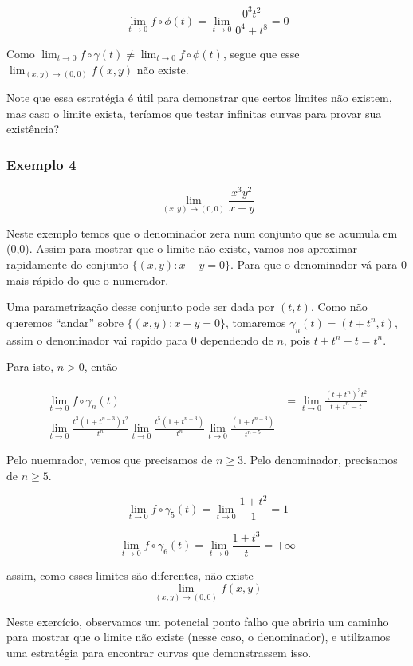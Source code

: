 \documentclass[
  letterpaper,
  DIV=11,
  numbers=noendperiod]{scrreprt}
\begin{document}
\[
\lim_{t\rightarrow 0} f \circ \phi (t) = \lim_{t\rightarrow 0} \frac{0^3 t^2}{0^4+t^8} = 0
\]

Como
\(\lim_{t\rightarrow 0} f \circ \gamma (t) \neq \lim_{t\rightarrow 0} f \circ \phi(t)\),
segue que esse \(\lim_{(x,y)\rightarrow (0,0)} f(x,y)\) não existe.

Note que essa estratégia é útil para demonstrar que certos limites não
existem, mas caso o limite exista, teríamos que testar infinitas curvas
para provar sua existência?

\subsubsection{Exemplo 4}\label{exemplo-4}

\[
\lim_{(x,y) \rightarrow (0,0)} \frac{x^3 y^2}{x-y}
\]

Neste exemplo temos que o denominador zera num conjunto que se acumula
em (0,0). Assim para mostrar que o limite não existe, vamos nos
aproximar rapidamente do conjunto \(\{(x,y):x-y =0\}\). Para que o
denominador vá para \(0\) mais rápido do que o numerador.

Uma parametrização desse conjunto pode ser dada por \((t,t)\). Como não
queremos ``andar'' sobre \(\{(x,y):x-y =0\}\), tomaremos
\(\gamma_n (t) = (t+t^n,t)\), assim o denominador vai rapido para 0
dependendo de \(n\), pois \(t+t^n-t = t^n\).

Para isto, \(n>0\), então

\[
\begin{aligned}
\lim_{t\rightarrow 0} f \circ \gamma_{n}(t) &= \lim_{t\rightarrow 0}
\frac{(t+t^n)^3t^2}{t+t^n-t} \\
\lim_{t\rightarrow 0} \frac{t^3 (1+t^{n-3})t^2}{t^n}
\lim_{t\rightarrow 0} \frac{t^5 (1+t^{n-3})}{t^n}
\lim_{t\rightarrow 0} \frac{(1+t^{n-3})}{t^{n-5}}
\end{aligned}
\]

Pelo nuemrador, vemos que precisamos de \(n\geq 3\). Pelo denominador,
precisamos de \(n \geq 5\).

\[
\lim_{t\rightarrow 0} f\circ \gamma_5 (t) = \lim_{t\rightarrow 0} \frac{1+t^2}{1} = 1
\]

\[
\lim_{t\rightarrow 0} f\circ \gamma_6 (t) = \lim_{t\rightarrow 0} \frac{1+t^3}{t} = +\infty
\]

assim, como esses limites são diferentes, não existe \[
\lim_{(x,y)\rightarrow(0,0)} f(x,y)
\]

Neste exercício, observamos um potencial ponto falho que abriria um
caminho para mostrar que o limite não existe (nesse caso, o
denominador), e utilizamos uma estratégia para encontrar curvas que
demonstrassem isso.
\end{document}
